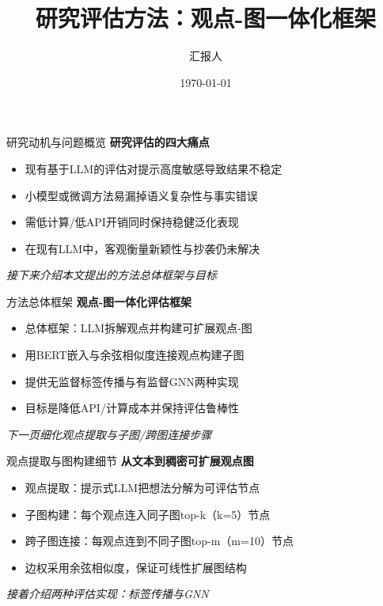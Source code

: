 \documentclass{beamer}
\title{研究评估方法：观点-图一体化框架}
\author{汇报人}
\institute{XXX实验室}
\date{\today}
\begin{document}
\begin{frame}
    \titlepage
\end{frame}

\begin{frame}{研究动机与问题概览}
    \textbf{研究评估的四大痛点}
    \begin{itemize}
        \item 现有基于LLM的评估对提示高度敏感导致结果不稳定
        \item 小模型或微调方法易漏掉语义复杂性与事实错误
        \item 需低计算/低API开销同时保持稳健泛化表现
        \item 在现有LLM中，客观衡量新颖性与抄袭仍未解决
    \end{itemize}
    \vspace{1em}
    \textit{接下来介绍本文提出的方法总体框架与目标}
\end{frame}

\begin{frame}{方法总体框架}
    \textbf{观点-图一体化评估框架}
    \begin{itemize}
        \item 总体框架：LLM拆解观点并构建可扩展观点-图
        \item 用BERT嵌入与余弦相似度连接观点构建子图
        \item 提供无监督标签传播与有监督GNN两种实现
        \item 目标是降低API/计算成本并保持评估鲁棒性
    \end{itemize}
    \vspace{1em}
    \textit{下一页细化观点提取与子图/跨图连接步骤}
\end{frame}

\begin{frame}{观点提取与图构建细节}
    \textbf{从文本到稠密可扩展观点图}
    \begin{itemize}
        \item 观点提取：提示式LLM把想法分解为可评估节点
        \item 子图构建：每个观点连入同子图top-k（k=5）节点
        \item 跨子图连接：每观点连到不同子图top-m（m=10）节点
        \item 边权采用余弦相似度，保证可线性扩展图结构
    \end{itemize}
    \vspace{1em}
    \textit{接着介绍两种评估实现：标签传播与GNN}
\end{frame}
\end{document}
